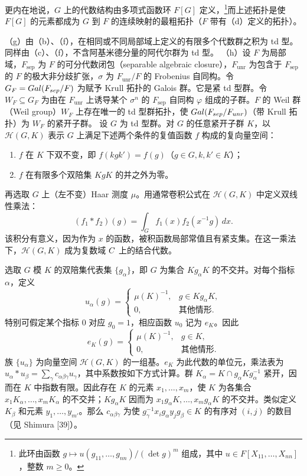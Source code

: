 更内在地说，$G$ 上的代数结构由多项式函数环 $F[G]$ 定义，\footnote{此环由函数 $g\mapsto u(g_{11},\ldots,g_{nn})/(\det g)^m$ 组成，其中 $u\in F[X_{11},\ldots,X_{nn}]$，整数 $m\geq0$。}而上述拓扑是使 $F[G]$ 的元素都成为 $G$ 到 $F$ 的连续映射的最粗拓扑（$F$ 带有（d）定义的拓扑）。

（g）由（b）、（f），在相同或不同局部域上定义的有限多个代数群之积为 td 型。同样由（c）、（f），不含阿基米德分量的阿代尔群为 td 型。
（h）设 $F$ 为局部域，$F_{\mathrm{sep}}$ 为 $F$ 的可分代数闭包（separable algebraic closure），$F_{\mathrm{unr}}$ 为包含于 $F_{\mathrm{sep}}$ 的 $F$ 的极大非分歧扩张，$\sigma$ 为 $F_{\mathrm{unr}}/F$ 的 Frobenius 自同构。令 $G_F=Gal(F_{sep}/F)$ 为赋予 Krull 拓扑的 Galois 群。它是紧 td 型群。令 $W_F\subseteq G_F$ 为由在 $F_{\mathrm{unr}}$ 上诱导某个 $\sigma^n$ 的 $F_{\mathrm{sep}}$ 自同构 $\varphi$ 组成的子群。$F$ 的 Weil 群（Weil group）$W_F$ 上存在唯一的 td 型群拓扑，使 $Gal(F_{sep}/F_{unr})$（带 Krull 拓扑）为 $W_F$ 的紧开子群。
设 $G$ 为 td 型群。对 $G$ 的任意紧开子群 $K$，以 $\mathcal H(G,K)$ 表示 $G$ 上满足下述两个条件的复值函数 $f$ 构成的复向量空间：
\begin{enumerate}
\item[(a)] $f$ 在 $K$ 下双不变，即 $f(kgk')=f(g)$（$g\in G,k,k'\in K$）；
\item[(b)] $f$ 在有限多个双陪集 $KgK$ 的并之外为零。
\end{enumerate}
再选取 $G$ 上（左不变）Haar 测度 $\mu$。用通常卷积公式在 $\mathcal H(G,K)$ 中定义双线性乘法：
\[
(f_1*f_2)(g)=\int_G f_1(x)f_2(x^{-1}g)\,dx.\tag{4}
\]
该积分有意义，因为作为 $x$ 的函数，被积函数局部常值且有紧支集。在这一乘法下，$\mathcal H(G,K)$ 成为复数域 $C$ 上的结合代数。

选取 $G$ 模 $K$ 的双陪集代表集 $\{g_\alpha\}$，即 $G$ 为集合 $Kg_\alpha K$ 的不交并。对每个指标 $\alpha$，定义
\[
u_\alpha(g)=\begin{cases}\mu(K)^{-1},&g\in Kg_\alpha K,\\0,&\text{其他情形}.\end{cases}\tag{5}
\]
特别可假定某个指标 $0$ 对应 $g_0=1$，相应函数 $u_0$ 记为 $e_K$。因此
\[
e_K(g)=\begin{cases}\mu(K)^{-1},&g\in K,\\0,&\text{其他情形}.\end{cases}\tag{6}
\]
族 $\{u_\alpha\}$ 为向量空间 $\mathcal H(G,K)$ 的一组基。$e_K$ 为此代数的单位元，乘法表为 $u_\alpha*u_\beta=\sum_\gamma c_{\alpha\beta\gamma}u_\gamma$，其中系数按如下方式计算。群 $K_\alpha=K\cap g_\alpha Kg_\alpha^{-1}$ 紧开，因而在 $K$ 中指数有限。因此存在 $K$ 的元素 $x_1,\ldots,x_m$，使 $K$ 为各集合 $x_1K_\alpha,\ldots,x_mK_\alpha$ 的不交并；$Kg_\alpha K$ 因而为 $x_1g_\alpha K,\ldots,x_mg_\alpha K$ 的不交并。类似定义 $K_\beta$ 和元素 $y_1,\ldots,y_{m'}$。那么 $c_{\alpha\beta\gamma}$ 为使 $g_\gamma^{-1}x_i g_\alpha y_jg_\beta\in K$ 的有序对 $(i,j)$ 的数目（见 Shimura [39]）。

